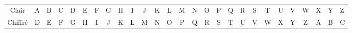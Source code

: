 
\begin{tabular}{c|c|c|c|c|c|c|c|c|c|c|c|c|c|c|c|c|c|c|c|c|c|c|c|c|c}
Clair	&A	&B	&C	&D	&E	&F	&G	&H	&I	&J	&K	&L	&M	&N	&O	&P	&Q	&R	&S	&T	&U	&V	&W	&X	&Y	&Z\\
Chiffré	&D	&E	&F	&G	&H	&I	&J	&K	&L	&M	&N	&O	&P	&Q	&R	&S	&T	&U	&V	&W	&X	&Y	&Z	&A	&B	&C\\
\end{tabular}
